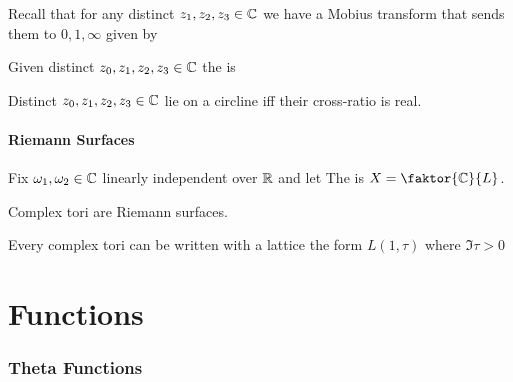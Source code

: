\documentclass{article}
\begin{document}
Recall that for any distinct $z_1, z_2, z_3 \in \mathbb{C}$ we have a Mobius transform that sends them to $0,1,\infty$ given by 
\begin{definition}
Given distinct $z_0, z_1, z_2, z_3 \in \mathbb{C}$ the  is 
\end{definition}

\begin{prop}
Distinct $z_0, z_1, z_2, z_3 \in \mathbb{C}$ lie on a circline iff their cross-ratio is real. 
\end{prop}

\subsection{Riemann Surfaces}

\begin{definition}
	Fix $\omega_1, \omega_2 \in \mathbb{C}$ linearly independent over $\mathbb{R}$ and let 
The  is $X = \faktor{\mbb{C}}{L}$. 
\end{definition}

\begin{prop}
	Complex tori are Riemann surfaces. 
\end{prop}

\begin{prop}
	Every complex tori can be written with a lattice the form $L(1,\tau)$ where $\Im\tau > 0$
\end{prop}

\part{Functions}


\section{Theta Functions}
\end{document}
